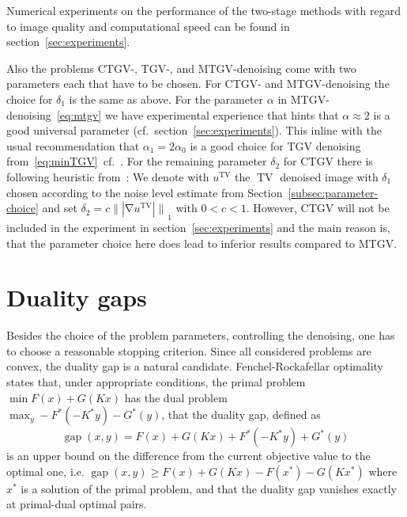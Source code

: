 \documentclass[twocolumn,envcountsame]{svjour3}
\newcommand{\norm}[2][]{{\|{#2}\|_{}}_{#1}}
\newcommand{\abs}[1]{|#1|}
\DeclareMathOperator{\gap}{gap}
\DeclareMathOperator{\grad}{\nabla}
\DeclareMathOperator{\TV}{TV}
\begin{document}
Numerical experiments on the performance of the two-stage methods with regard to image quality and
computational speed can be found in section~\ref{sec:experiments}.

Also the problems CTGV-, TGV-, and MTGV-denoising come with two parameters each that have to be chosen.
For CTGV- and MTGV-denoising the choice for $\delta_{1}$ is the same as above.
For the parameter $\alpha$ in MTGV-denoising~\eqref{eq:mtgv} we have experimental experience that hints that $\alpha \approx 2$ is a good universal parameter (cf.~section~\ref{sec:experiments}).
This inline with the usual recommendation that $\alpha_1 = 2\alpha_0$ is a good choice for TGV denoising from~\eqref{eq:minTGV}~cf.~\cite{KnollBrediesTGV2011}.
For the remaining parameter $\delta_{2}$ for CTGV there is following heuristic from~\cite{komander2017denoising}:
We denote with $u^{\TV}$ the $\TV$ denoised image with $\delta_{1}$ chosen according to the noise level estimate from Section~\ref{subsec:parameter-choice} and set $\delta_{2} =c\norm[1]{\abs{\grad u^{\TV}}}$ with $0<c<1$.
However, CTGV will not be included in the experiment in section~\ref{sec:experiments} and the main reason is, that the parameter choice here does lead to inferior results compared to MTGV.


\section{Duality gaps}
\label{sec:gaps} 
Besides the choice of the problem parameters, controlling the denoising, one has to choose a reasonable stopping criterion.
Since all considered problems are convex, the duality gap is a natural candidate.
Fenchel-Rockafellar optimality~\cite{ekeland1976convex} states that, under appropriate conditions, the primal problem 
$\min F(x) + G(Kx)$ has the dual problem \\
$\max_{y}-F^{*}(-K^{*}y) - G^{*}(y)$, that the duality gap, defined as
\[
\gap(x,y) = F(x) + G(Kx) + F^*(-K^{*}y) + G^{*}(y)
\]
is an upper bound on the difference from the current objective value to the optimal one, i.e. $\gap(x,y)\geq F(x) + G(Kx) - F(x^{*}) - G(Kx^{*})$ where $x^{*}$ is a solution of the primal problem, and that the duality gap vanishes exactly at primal-dual optimal pairs.
\end{document}
